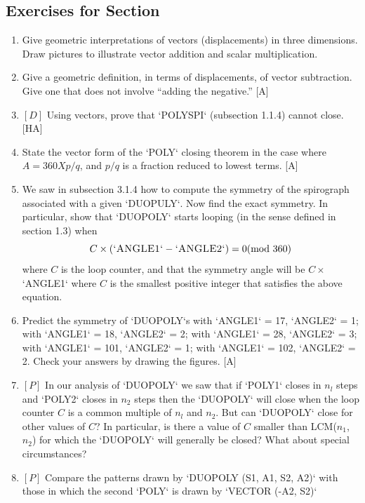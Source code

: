 \documentclass{book}
\begin{document}
\subsection{Exercises for Section \thesection}
\begin{enumerate}
\item Give geometric interpretations of vectors (displacements) in three
dimensions. Draw pictures to illustrate vector addition and scalar multiplication.
\item Give a geometric definition, in terms of displacements, of vector
subtraction. Give one that does not involve ``adding the negative.'' [A]
\item $[D]$ Using vectors, prove that \textsc{`POLYSPI`} (subsection 1.1.4) cannot close.
[HA]
\item State the vector form of the \textsc{`POLY`} closing theorem in the case where
$A = 360 X p/ q$, and $p/q$ is a fraction reduced to lowest terms. [A]
\item We saw in subsection 3.1.4 how to compute the symmetry of the
spirograph associated with a given \textsc{`DUOPULY`}. Now find the exact symmetry. In particular, show that \textsc{`DUOPOLY`} starts looping (in the sense
defined in section 1.3) when
$$C \times ( \text{\textsc{`ANGLE1`}} - \text{\textsc{`ANGLE2`}}) = 0 \text{(mod 360)}$$
where $C$ is the loop counter, and that the symmetry angle will be $C \times $\textsc{`ANGLE1`} where $C$ is the smallest positive integer that satisfies the above
equation.  
\item Predict the symmetry of \textsc{`DUOPOLY`}s with \textsc{`ANGLE1`} = 17, \textsc{`ANGLE2`} = 1;
with \textsc{`ANGLE1`} = 18, \textsc{`ANGLE2`} = 2; with \textsc{`ANGLE1`} = 28, \textsc{`ANGLE2`} = 3; with
\textsc{`ANGLE1`} = 101, \textsc{`ANGLE2`} = 1; with \textsc{`ANGLE1`} = 102, \textsc{`ANGLE2`} = 2. Check
your answers by drawing the figures. [A]
\item $[P]$ In our analysis of \textsc{`DUOPOLY`} we saw that if \textsc{`POLY1`} closes in $n_l$
steps and \textsc{`POLY2`} closes in $n_2$ steps then the \textsc{`DUOPOLY`} will close when the
loop counter $C$ is a common multiple of $n_l$ and $n_2$. But can \textsc{`DUOPOLY`}
close for other values of $C$? In particular, is there a value of $C$ smaller
than LCM($n_1$, $n_2$) for which the \textsc{`DUOPOLY`} will generally be closed? What
about special circumstances?
\item $[P]$ Compare the patterns drawn by \textsc{`DUOPOLY (S1, A1, S2, A2)`}
with those in which the second \textsc{`POLY`} is drawn by \textsc{`VECTOR (-A2, S2)`}

\end{enumerate}
\end{document}
